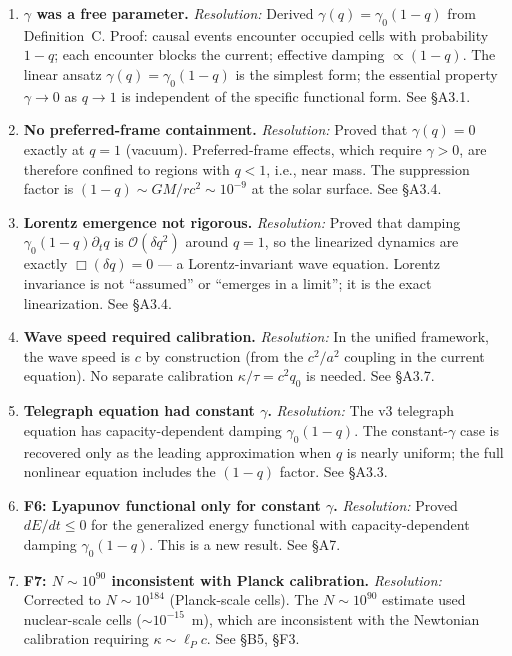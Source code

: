 \documentclass[reprint]{revtex4-2}
\begin{document}
\begin{enumerate}[leftmargin=*]
\item[\textbf{F1:}] \textbf{$\gamma$ was a free parameter.} \textit{Resolution:} Derived $\gamma(q)=\gamma_0(1-q)$ from Definition~C. Proof: causal events encounter occupied cells with probability $1-q$; each encounter blocks the current; effective damping $\propto (1-q)$. The linear ansatz $\gamma(q)=\gamma_0(1-q)$ is the simplest form; the essential property $\gamma\to 0$ as $q\to 1$ is independent of the specific functional form. See \S A3.1.

\item[\textbf{F2:}] \textbf{No preferred-frame containment.} \textit{Resolution:} Proved that $\gamma(q)=0$ exactly at $q=1$ (vacuum). Preferred-frame effects, which require $\gamma>0$, are therefore confined to regions with $q<1$, i.e., near mass. The suppression factor is $(1-q) \sim GM/rc^2 \sim 10^{-9}$ at the solar surface. See \S A3.4.

\item[\textbf{F3:}] \textbf{Lorentz emergence not rigorous.} \textit{Resolution:} Proved that damping $\gamma_0(1-q)\partial_t q$ is $\mathcal{O}(\delta q^2)$ around $q=1$, so the linearized dynamics are exactly $\Box(\delta q)=0$ --- a Lorentz-invariant wave equation. Lorentz invariance is not ``assumed'' or ``emerges in a limit''; it is the exact linearization. See \S A3.4.

\item[\textbf{F4:}] \textbf{Wave speed required calibration.} \textit{Resolution:} In the unified framework, the wave speed is $c$ by construction (from the $c^2/a^2$ coupling in the current equation). No separate calibration $\kappa/\tau = c^2 q_0$ is needed. See \S A3.7.

\item[\textbf{F5:}] \textbf{Telegraph equation had constant $\gamma$.} \textit{Resolution:} The v3 telegraph equation has capacity-dependent damping $\gamma_0(1-q)$. The constant-$\gamma$ case is recovered only as the leading approximation when $q$ is nearly uniform; the full nonlinear equation includes the $(1-q)$ factor. See \S A3.3.

\item \textbf{F6: Lyapunov functional only for constant $\gamma$.} \textit{Resolution:} Proved $dE/dt \le 0$ for the generalized energy functional with capacity-dependent damping $\gamma_0(1-q)$. This is a new result. See \S A7.

\item \textbf{F7: $N\sim 10^{90}$ inconsistent with Planck calibration.} \textit{Resolution:} Corrected to $N\sim 10^{184}$ (Planck-scale cells). The $N\sim 10^{90}$ estimate used nuclear-scale cells ($\sim 10^{-15}$~m), which are inconsistent with the Newtonian calibration requiring $\kappa \sim \ell_P c$. See \S B5, \S F3.
\end{enumerate}
\end{document}
